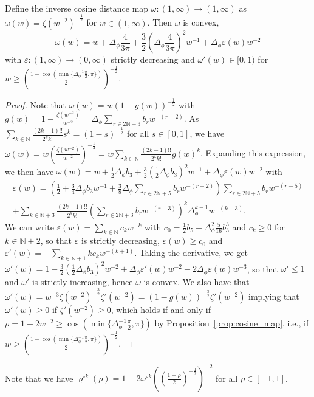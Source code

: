 \documentclass[twoside,11pt]{article}
\newcommand{\N}{\mathbb{N}}
\begin{document}
\begin{proposition}\label{prop:inverse_cosine_distance_map}~\\
Define the inverse cosine distance map $\omega : (1,\infty) \to (1,\infty)$ as $\omega(w) = \zeta(w^{-2})^{-\frac{1}{2}}$ for $w \in (1,\infty)$. Then $\omega$ is convex,
\[
\omega(w) = w + \Delta_\phi \frac{4}{3\pi} + \frac{3}{2} \left( \Delta_\phi \frac{4}{3\pi} \right)^2 w^{-1} + \Delta_\phi \varepsilon(w) w^{-2}
\]
with $\varepsilon : (1,\infty) \to (0,\infty)$ strictly decreasing and $\omega'(w) \in [0,1)$ for $w \geq \left( \frac{1-\cos(\min\{ \Delta_\phi^{-1} \frac{\pi}{2}, \pi\})}{2} \right)^{-\frac{1}{2}}$.
\end{proposition}
\begin{proof}
Note that $\omega(w) = w (1 - g(w))^{-\frac{1}{2}}$ with $g(w) = 1 - \frac{\zeta(w^{-2})}{w^{-2}} = \Delta_\phi \sum_{r \in 2\N+3} b_r w^{-(r-2)}$. As $\sum_{k \in \N} \frac{(2k-1)!!}{2^k k!} s^k = (1-s)^{-\frac{1}{2}}$ for all $s \in [0,1]$, we have $\omega(w) = w \left( \frac{\zeta(w^{-2})}{w^{-2}} \right)^{-\frac{1}{2}} = w \sum_{k \in \N} \frac{(2k-1)!!}{2^k k!} g(w)^k$. Expanding this expression, we then have $\omega(w) = w + \frac{1}{2} \Delta_\phi b_3 + \frac{3}{2} ( \frac{1}{2} \Delta_\phi b_3 )^2 w^{-1} + \Delta_\phi \varepsilon(w) w^{-2}$ with
\begin{multline*}
\varepsilon(w) = \left( \frac{1}{2} + \frac{3}{4} \Delta_\phi b_3 w^{-1} + \frac{3}{8} \Delta_\phi \sum_{r \in 2\N+5} b_r w^{-(r-2)} \right) \sum_{r \in 2\N+5} b_r w^{-(r-5)} \\
+ \sum_{k \in \N+3} \frac{(2k-1)!!}{2^k k!} \left( \sum_{r \in 2\N+3} b_r w^{-(r-3)} \right)^k \Delta_\phi^{k-1} w^{-(k-3)}.
\end{multline*}
We can write $\varepsilon(w) = \sum_{k \in \N} c_k w^{-k}$ with $c_0 = \frac{1}{2} b_5 + \Delta_\phi^2 \frac{5}{16} b_3^3$ and $c_k \geq 0$ for $k \in \N+2$, so that $\varepsilon$ is strictly decreasing, $\varepsilon(w) \geq c_0$ and $\varepsilon'(w) = -\sum_{k \in \N+1} k c_k w^{-(k+1)}$. Taking the derivative, we get $\omega'(w) = 1 - \frac{3}{2} ( \frac{1}{2} \Delta_\phi b_3 )^2 w^{-2} + \Delta_\phi \varepsilon'(w) w^{-2} - 2 \Delta_\phi \varepsilon(w) w^{-3}$, so that $\omega' \leq 1$ and $\omega'$ is strictly increasing, hence $\omega$ is convex. We also have that $\omega'(w) = w^{-3} \zeta(w^{-2})^{-\frac{3}{2}} \zeta'(w^{-2}) = (1-g(w))^{-\frac{3}{2}} \zeta'(w^{-2})$ implying that $\omega'(w) \geq 0$ if $\zeta'(w^{-2}) \geq 0$, which holds if and only if $\rho = 1 - 2w^{-2} \geq \cos(\min\{ \Delta_\phi^{-1} \frac{\pi}{2}, \pi\})$ by Proposition~\ref{prop:cosine_map}, i.e., if $w \geq (\frac{1-\cos(\min\{ \Delta_\phi^{-1} \frac{\pi}{2}, \pi\})}{2})^{-\frac{1}{2}}$.
\end{proof}
Note that we have $\varrho^{\circ k}(\rho) = 1 - 2 \omega^{\circ k}\left( \left( \frac{1-\rho}{2} \right)^{-\frac{1}{2}} \right)^{-2}$ for all $\rho \in [-1,1]$.
\end{document}
